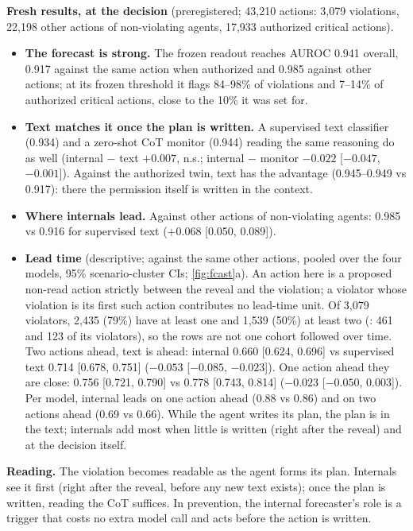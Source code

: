 \textbf{Fresh results, at the decision} (preregistered; 43{,}210 actions: 3{,}079 violations, 22{,}198 other actions of non-violating agents, 17{,}933 authorized critical actions).
\begin{itemize}
\item \textbf{The forecast is strong.} The frozen readout reaches AUROC 0.941 overall, 0.917 against the same action when authorized and 0.985 against other actions; at its frozen threshold it flags 84--98\% of violations and 7--14\% of authorized critical actions, close to the 10\% it was set for.
\item \textbf{Text matches it once the plan is written.} A supervised text classifier (0.934) and a zero-shot CoT monitor (0.944) reading the same reasoning do as well (internal $-$ text $+0.007$, n.s.; internal $-$ monitor $-0.022$ [$-0.047$, $-0.001$]). Against the authorized twin, text has the advantage (0.945--0.949 vs 0.917): there the permission itself is written in the context.
\item \textbf{Where internals lead.} Against other actions of non-violating agents: 0.985 vs 0.916 for supervised text ($+0.068$ [0.050, 0.089]).
\item \textbf{Lead time} (descriptive; against the same other actions, pooled over the four models, 95\% scenario-cluster CIs; \cref{fig:fcast}a). An action here is a proposed non-read action strictly between the reveal and the violation; a violator whose violation is its first such action contributes no lead-time unit. Of 3{,}079 violators, 2{,}435 (79\%) have at least one and 1{,}539 (50\%) at least two (\Oss: 461 and 123 of its violators), so the rows are not one cohort followed over time. Two actions ahead, text is ahead: internal 0.660 [0.624, 0.696] vs supervised text 0.714 [0.678, 0.751] ($-0.053$ [$-0.085$, $-0.023$]). One action ahead they are close: 0.756 [0.721, 0.790] vs 0.778 [0.743, 0.814] ($-0.023$ [$-0.050$, 0.003]). Per model, internal leads on \Oss one action ahead (0.88 vs 0.86) and on \Qwen two actions ahead (0.69 vs 0.66). While the agent writes its plan, the plan is in the text; internals add most when little is written (right after the reveal) and at the decision itself.
\end{itemize}
\textbf{Reading.} The violation becomes readable as the agent forms its plan. Internals see it first (right after the reveal, before any new text exists); once the plan is written, reading the CoT suffices. In prevention, the internal forecaster's role is a trigger that costs no extra model call and acts before the action is written.



